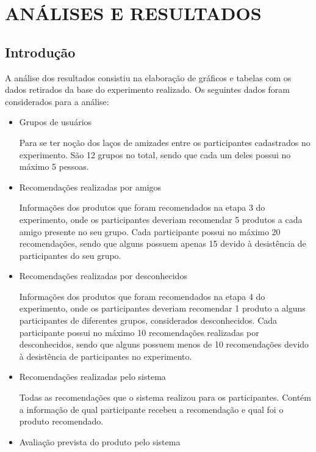 \chapter{ANÁLISES E RESULTADOS} %
\label{cha:analises_e_resultados}

\section{Introdução}
\label{cha:introducao}

 A análise dos resultados consistiu na elaboração de gráficos e tabelas com os dados retirados da base do experimento realizado. Os seguintes dados foram considerados para a análise:
 
\begin{itemize}
	\item Grupos de usuários
	
	\subitem Para se ter noção dos laços de amizades entre os participantes cadastrados no experimento. São 12 grupos no total, sendo que cada um deles possui no máximo 5 pessoas.
	
	\item Recomendações realizadas por amigos
	
	\subitem Informações dos produtos que foram recomendados na etapa 3 do experimento, onde os participantes deveriam recomendar 5 produtos a cada amigo presente no seu grupo. Cada participante possui no máximo 20 recomendações, sendo que alguns possuem apenas 15 devido à desistência de participantes do seu grupo.
	
	\item Recomendações realizadas por desconhecidos
	
	\subitem Informações dos produtos que foram recomendados na etapa 4 do experimento, onde os participantes deveriam recomendar 1 produto a alguns participantes de diferentes grupos, considerados desconhecidos. Cada participante possui no máximo 10 recomendações realizadas por desconhecidos, sendo que alguns possuem menos de 10 recomendações devido à desistência de participantes no experimento.
	
	\item Recomendações realizadas pelo sistema
	
	\subitem Todas as recomendações que o sistema realizou para os participantes. Contém a informação de qual participante recebeu a recomendação e qual foi o produto recomendado.
	
	\item Avaliação prevista do produto pelo sistema
	

\end{itemize}
